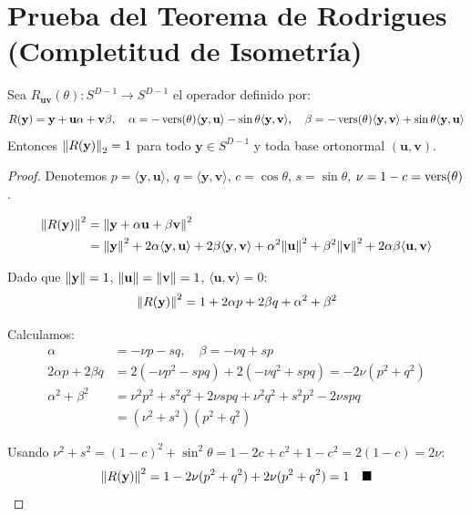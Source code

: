 \section{Prueba del Teorema de Rodrigues (Completitud de Isometría)}

\begin{theorem}
Sea $R_{\mathbf{u}\mathbf{v}}(\theta) : S^{D-1} \to S^{D-1}$ el operador definido por:
\begin{equation}
R(\mathbf{y}) = \mathbf{y} + \mathbf{u}\alpha + \mathbf{v}\beta, \quad
\alpha = -\operatorname{vers}(\theta)\langle\mathbf{y},\mathbf{u}\rangle - \sin\theta\langle\mathbf{y},\mathbf{v}\rangle, \quad
\beta = -\operatorname{vers}(\theta)\langle\mathbf{y},\mathbf{v}\rangle + \sin\theta\langle\mathbf{y},\mathbf{u}\rangle
\end{equation}
Entonces $\norm{R(\mathbf{y})}_2 = 1$ para todo $\mathbf{y} \in S^{D-1}$ y toda base ortonormal $(\mathbf{u},\mathbf{v})$.
\end{theorem}

\begin{proof}
Denotemos $p = \langle\mathbf{y},\mathbf{u}\rangle$, $q = \langle\mathbf{y},\mathbf{v}\rangle$,
$c = \cos\theta$, $s = \sin\theta$, $\nu = 1 - c = \operatorname{vers}(\theta)$.

\begin{align}
\norm{R(\mathbf{y})}^2 &= \norm{\mathbf{y} + \alpha\mathbf{u} + \beta\mathbf{v}}^2 \\
&= \norm{\mathbf{y}}^2 + 2\alpha\langle\mathbf{y},\mathbf{u}\rangle + 2\beta\langle\mathbf{y},\mathbf{v}\rangle + \alpha^2\norm{\mathbf{u}}^2 + \beta^2\norm{\mathbf{v}}^2 + 2\alpha\beta\langle\mathbf{u},\mathbf{v}\rangle
\end{align}

Dado que $\norm{\mathbf{y}} = 1$, $\norm{\mathbf{u}} = \norm{\mathbf{v}} = 1$, $\langle\mathbf{u},\mathbf{v}\rangle = 0$:
\begin{equation}
\norm{R(\mathbf{y})}^2 = 1 + 2\alpha p + 2\beta q + \alpha^2 + \beta^2
\end{equation}

Calculamos:
\begin{align}
\alpha &= -\nu p - sq, \quad \beta = -\nu q + sp \\
2\alpha p + 2\beta q &= 2(-\nu p^2 - spq) + 2(-\nu q^2 + spq) = -2\nu(p^2 + q^2) \\
\alpha^2 + \beta^2 &= \nu^2 p^2 + s^2q^2 + 2\nu spq + \nu^2q^2 + s^2p^2 - 2\nu spq \\
&= (\nu^2 + s^2)(p^2 + q^2)
\end{align}

Usando $\nu^2 + s^2 = (1-c)^2 + \sin^2\theta = 1 - 2c + c^2 + 1 - c^2 = 2(1-c) = 2\nu$:
\begin{equation}
\norm{R(\mathbf{y})}^2 = 1 - 2\nu(p^2+q^2) + 2\nu(p^2+q^2) = 1 \quad \blacksquare
\end{equation}
\end{proof}

